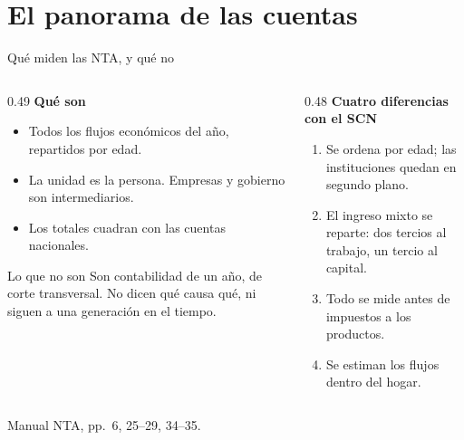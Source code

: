 \documentclass[aspectratio=169,11pt]{beamer}
\newcommand{\fuente}[1]{\par\vfill{\small\color{cGris}#1\par}}
\begin{document}
\section{El panorama de las cuentas}

\begin{frame}{Qué miden las NTA, y qué no}
  \begin{columns}[T]
    \begin{column}{0.49\textwidth}
      \textbf{Qué son}
      \begin{itemize}
        \item Todos los flujos económicos del año, repartidos por edad.
        \item La unidad es la persona. Empresas y gobierno son intermediarios.
        \item Los totales cuadran con las cuentas nacionales.
      \end{itemize}
      \pause
      \begin{alertblock}{Lo que no son}
        Son contabilidad de un año, de corte transversal. No dicen qué causa qué, ni siguen a una generación en el tiempo.
      \end{alertblock}
    \end{column}
    \begin{column}{0.48\textwidth}
      \pause
      \textbf{Cuatro diferencias con el SCN}
      \begin{enumerate}
        \item Se ordena por edad; las instituciones quedan en segundo plano.
        \item El ingreso mixto se reparte: dos tercios al trabajo, un tercio al capital.
        \item Todo se mide antes de impuestos a los productos.
        \item Se estiman los flujos dentro del hogar.
      \end{enumerate}
    \end{column}
  \end{columns}
  \fuente{Manual NTA, pp.~6, 25--29, 34--35.}
\end{frame}
\end{document}
